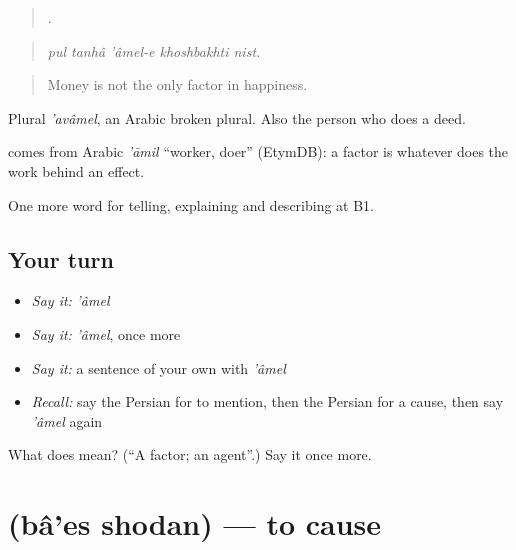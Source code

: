 \begin{quote}
    .
\end{quote}

\begin{quote}
\emph{pul tanhâ 'âmel-e khoshbakhti nist.}
\end{quote}

\begin{quote}
Money is not the only factor in happiness.
\end{quote}

Plural \emph{'avâmel}, an Arabic broken plural. Also the person who does a deed.

\begin{cousinweb}
\textbf{} comes from Arabic \emph{'āmil} \textquotedblleft{}worker, doer\textquotedblright{} (EtymDB): a factor is whatever does the work behind an effect.
\end{cousinweb}

\begin{grammarlens}[title={What you've built}]
One more word for telling, explaining and describing at B1.
\end{grammarlens}

\subsection*{Your turn}
\begin{itemize}
\raggedright
  \item \emph{Say it:} \emph{'âmel}
  \item \emph{Say it:} \emph{'âmel}, once more
  \item \emph{Say it:} a sentence of your own with \emph{'âmel}
  \item \emph{Recall:} say the Persian for to mention, then the Persian for a cause, then say \emph{'âmel} again
\end{itemize}

\begin{tcolorbox}[breakable,colback=teal!4,colframe=teal!35!black,title={Before you move on}]
What does  mean? (\textquotedblleft{}A factor; an agent\textquotedblright{}.) Say it once more.
\end{tcolorbox}
\section[\texorpdfstring{\fa{باعث} \fa{شدن} (bâ'es shodan)}{باعث شدن (bâ'es shodan)}]{  (bâ'es shodan) — to cause}

